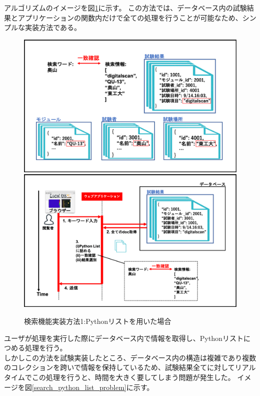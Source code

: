 アルゴリズムのイメージを図\ref{search_python_list}に示す。
この方法では、データベース内の試験結果とアプリケーションの関数内だけで全ての処理を行うことが可能なため、シンプルな実装方法である。

\begin{figure}[bpt]
  \begin{center}
    \includegraphics[width=16cm]{search_python_list}
    \includegraphics[width=16cm]{search_python_list_flow}
  \caption[検索機能実装方法1:Pythonリストを用いた場合]{検索機能実装方法1:Pythonリストを用いた場合}
  \label{search_python_list}
  \end{center}
\end{figure}

ユーザが処理を実行した際にデータベース内で情報を取得し、Pythonリストにつめる処理を行う。
\\

しかしこの方法を試験実装したところ、データベース内の構造は複雑であり複数のコレクションを跨いで情報を保持しているため、試験結果全てに対してリアルタイムでこの処理を行うと、時間を大きく要してしまう問題が発生した。
イメージを図\ref{search_python_list_problem}に示す。

